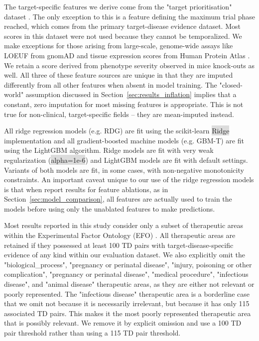 \documentclass{article}
\begin{document}
The target-specific features we derive come from the "target prioritisation" dataset \cite{OTtargetPrioritisation}. The only exception to this is a feature defining the maximum trial phase reached, which comes from the primary target-disease evidence dataset. Most scores in this dataset were not used because they cannot be temporalized. We make exceptions for those arising from large-scale, genome-wide assays like LOEUF from gnomAD \cite{PMID:32461654} and tissue expression scores from Human Protein Atlas \cite{PMID:25613900}. We retain a score derived from phenotype severity observed in mice knock-outs \cite{PMID:33231642} as well. All three of these feature sources are unique in that they are imputed differently from all other features when absent in model training. The "closed-world" assumption discussed in Section~\ref{sec:results_inflation} implies that a constant, zero imputation for most missing features is appropriate. This is not true for non-clinical, target-specific fields -- they are mean-imputed instead.

All ridge regression models (e.g. RDG) are fit using the scikit-learn \colorbox{Gainsboro}{Ridge} implementation and all gradient-boosted machine models (e.g. GBM-T) are fit using the LightGBM \cite{LightGBM} algorithm. Ridge models are fit with very weak regularization (\colorbox{Gainsboro}{alpha=1e-6}) and LightGBM models are fit with default settings. Variants of both models are fit, in some cases, with non-negative monotonicity constraints. An important caveat unique to our use of the ridge regression models is that when report results for feature ablations, as in Section~\ref{sec:model_comparison}, all features are actually used to train the models before using only the unablated features to make predictions.

Most results reported in this study consider only a subset of therapeutic areas within the Experimental Factor Ontology (EFO) \cite{PMID:20200009}. All therapeutic areas are retained if they possessed at least 100 TD pairs with target-disease-specific evidence of any kind within our evaluation dataset. We also explicitly omit the "biological\_process", "pregnancy or perinatal disease", "injury, poisoning or other complication", "pregnancy or perinatal disease", "medical procedure", "infectious disease", and "animal disease" therapeutic areas, as they are either not relevant or poorly represented. The "infectious disease" therapeutic area is a borderline case that we omit not because it is necessarily irrelevant, but because it has only 115 associated TD pairs. This makes it the most poorly represented therapeutic area that is possibly relevant. We remove it by explicit omission and use a 100 TD pair threshold rather than using a 115 TD pair threshold.
\end{document}
